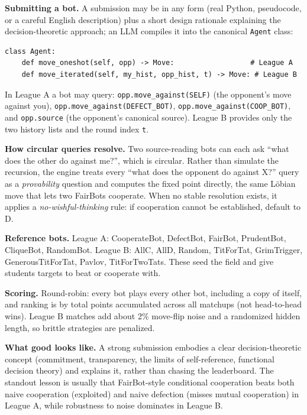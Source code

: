 \documentclass[11pt]{article}
\begin{document}
\textbf{Submitting a bot.} A submission may be in any form (real Python, pseudocode, or a careful English description) plus a short design rationale explaining the decision-theoretic approach; an LLM compiles it into the canonical \texttt{Agent} class:

\begin{verbatim}
class Agent:
    def move_oneshot(self, opp) -> Move:                  # League A
    def move_iterated(self, my_hist, opp_hist, t) -> Move: # League B
\end{verbatim}

In League A a bot may query: \texttt{opp.move\_against(SELF)} (the opponent's move against you), \texttt{opp.move\_against(DEFECT\_BOT)}, \texttt{opp.move\_against(COOP\_BOT)}, and \texttt{opp.source} (the opponent's canonical source). League B provides only the two history lists and the round index \texttt{t}.

\textbf{How circular queries resolve.} Two source-reading bots can each ask ``what does the other do against me?'', which is circular. Rather than simulate the recursion, the engine treats every ``what does the opponent do against X?'' query as a \emph{provability} question and computes the fixed point directly, the same Löbian move that lets two FairBots cooperate. When no stable resolution exists, it applies a \emph{no-wishful-thinking} rule: if cooperation cannot be established, default to D.

\textbf{Reference bots.} League A: CooperateBot, DefectBot, FairBot, PrudentBot, CliqueBot, RandomBot. League B: AllC, AllD, Random, TitForTat, GrimTrigger, GenerousTitForTat, Pavlov, TitForTwoTats. These seed the field and give students targets to beat or cooperate with.

\textbf{Scoring.} Round-robin: every bot plays every other bot, including a copy of itself, and ranking is by total points accumulated across all matchups (not head-to-head wins). League B matches add about 2\% move-flip noise and a randomized hidden length, so brittle strategies are penalized.

\textbf{What good looks like.} A strong submission embodies a clear decision-theoretic concept (commitment, transparency, the limits of self-reference, functional decision theory) and explains it, rather than chasing the leaderboard. The standout lesson is usually that FairBot-style conditional cooperation beats both naive cooperation (exploited) and naive defection (misses mutual cooperation) in League A, while robustness to noise dominates in League B.
\end{document}
